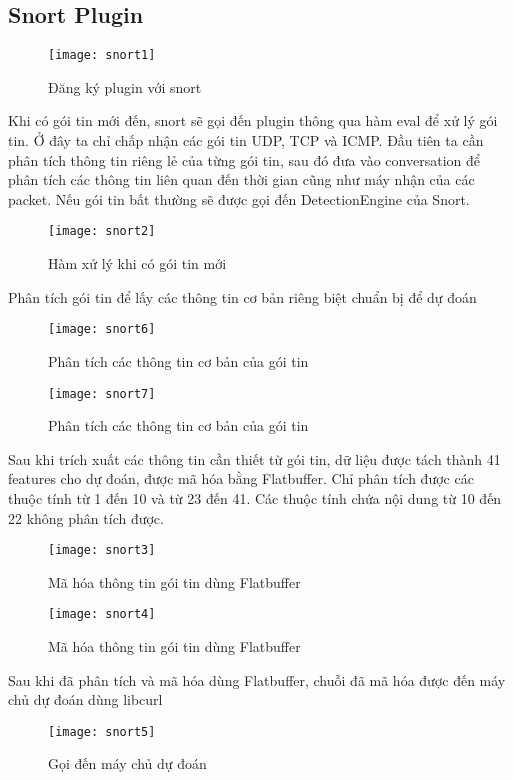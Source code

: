 \subsection{Snort Plugin}
\begin{figure}[!htbp]
    \centering
    \texttt{[image: snort1]}
    \caption{Đăng ký plugin với snort}
    \label{fig:x cubed graph}
\end{figure}
\FloatBarrier
Khi có gói tin mới đến, snort sẽ gọi đến plugin thông qua hàm eval để xử lý gói tin.
Ở đây ta chỉ chấp nhận các gói tin UDP, TCP và ICMP. Đầu tiên ta cần phân tích thông tin riêng lẻ của từng gói tin, sau đó đưa vào conversation
để phân tích các thông tin liên quan đến thời gian cũng như máy nhận của các packet.
Nếu gói tin bất thường sẽ được gọi đến DetectionEngine của Snort.
\begin{figure}[!htbp]
    \centering
    \texttt{[image: snort2]}
    \caption{Hàm xử lý khi có gói tin mới}
    \label{fig:x cubed graph}
\end{figure}
\FloatBarrier
Phân tích gói tin để lấy các thông tin cơ bản riêng biệt chuẩn bị để dự đoán
\begin{figure}[!htbp]
    \centering
    \texttt{[image: snort6]}
    \caption{Phân tích các thông tin cơ bản của gói tin}
    \label{fig:x cubed graph}
\end{figure}
\FloatBarrier
\begin{figure}[!htbp]
    \centering
    \texttt{[image: snort7]}
    \caption{Phân tích các thông tin cơ bản của gói tin}
    \label{fig:x cubed graph}
\end{figure}
\FloatBarrier
Sau khi trích xuất các thông tin cần thiết từ gói tin, dữ liệu được tách thành 41 features cho dự đoán, 
được mã hóa bằng Flatbuffer. Chỉ phân tích được các thuộc tính từ 1 đến 10 và từ 23 đến 41. 
Các thuộc tính chứa nội dung từ 10 đến 22 không phân tích được.
\begin{figure}[!htbp]
    \centering
    \texttt{[image: snort3]}
    \caption{Mã hóa thông tin gói tin dùng Flatbuffer}
    \label{fig:x cubed graph}
\end{figure}
\FloatBarrier
\begin{figure}[!htbp]
    \centering
    \texttt{[image: snort4]}
    \caption{Mã hóa thông tin gói tin dùng Flatbuffer}
    \label{fig:x cubed graph}
\end{figure}
\FloatBarrier
Sau khi đã phân tích và mã hóa dùng Flatbuffer, chuỗi đã mã hóa được đến máy chủ dự đoán dùng libcurl
\begin{figure}[!htbp]
    \centering
    \texttt{[image: snort5]}
    \caption{Gọi đến máy chủ dự đoán}
    \label{fig:x cubed graph}
\end{figure}
\FloatBarrier
